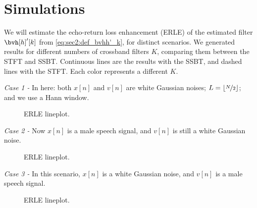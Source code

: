 
\section{Simulations}

We will estimate the echo-return loss enhancement (ERLE) of the estimated filter $\bvh[h]'[k]$ from \cref{eq:sec2:def_bvhh'_k}, for distinct scenarios. We generated results for different numbers of crossband filters $K$, comparing them between the STFT and SSBT. Continuous lines are the results with the SSBT, and dashed lines with the STFT. Each color represents a different $K$.

\noindent\textit{Case 1 -} In here: both $x[n]$ and $v[n]$ are white Gaussian noises; $L = \left\lfloor \nicefrac{N}{2} \right\rfloor$; and we use a Hann window.

\begin{figure}[H]
	\centering
	
	\caption{ERLE lineplot.}
	\label{fig:sec4:lineplot_erle_case1}
\end{figure}

%

\noindent\textit{Case 2 -} Now $x[n]$ is a male speech signal, and $v[n]$ is still a white Gaussian noise.

\begin{figure}[H]
	\centering
	
	\caption{ERLE lineplot.}
	\label{fig:sec4:lineplot_erle_case2}
\end{figure}

\noindent\textit{Case 3 -} In this scenario, $x[n]$ is a white Gaussian noise, and $v[n]$ is a male speech signal.

\begin{figure}[H]
	\centering
	
	\caption{ERLE lineplot.}
	\label{fig:sec4:lineplot_erle_case3}
\end{figure}


